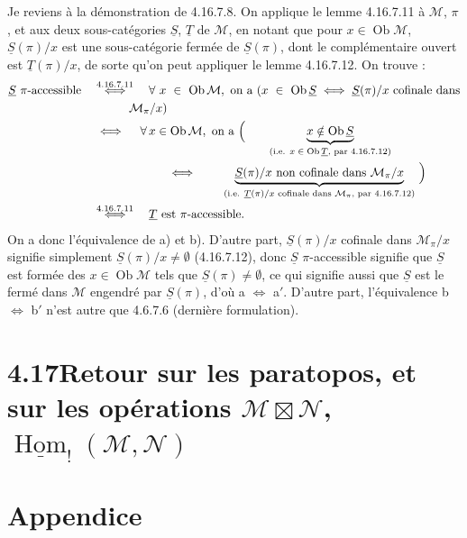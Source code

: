 \documentclass[11pt]{article}
\newcommand{\printedpage}[1]{\marginpar{\footnotesize p.~#1}}
\newcommand{\msp}[1]{\marginpar{\footnotesize [#1]}}
\newcommand{\cM}{\mathcal{M}}
\newcommand{\cN}{\mathcal{N}}
\newcommand{\Ob}{\operatorname{Ob}}
\begin{document}
\noindent Je reviens à la démonstration de 4.16.7.8. On applique le lemme 4.16.7.11 à $\cM$, $\pi$, et aux deux
\msp{page 491}
sous-catégories $\underline{S}$, $\underline{T}$ de $\cM$, en notant que pour $x\in\Ob\cM$, $\underline{S}(\pi)/x$ est une sous-catégorie fermée de $\underline{S}(\pi)$, dont le complémentaire ouvert est $\underline{T}(\pi)/x$, de sorte qu'on peut appliquer le lemme 4.16.7.12. On trouve :
\[
\begin{aligned}
\underline{S}\ \pi\text{-accessible} \quad &\overset{4.16.7.11}{\iff} \quad \forall\ x\ \in\ \Ob\cM,\ \text{on a } (x\ \in\ \Ob\underline{S}\iff\underline{S}(\pi)/x \text{ cofinale dans}\\
&\qquad\quad \cM_\pi/x)\\
&\iff \quad \forall\, x\in\Ob\cM,\ \text{on a } \Bigl( \qquad \underbrace{x\notin\Ob\underline{S}}_{\text{(i.e. $x\in\Ob\underline{T}$, par 4.16.7.12)}}\\
&\qquad\qquad\qquad \iff \qquad \underbrace{\underline{S}(\pi)/x \text{ non cofinale dans } \cM_\pi/x}_{\text{(i.e. $\underline{T}(\pi)/x$ cofinale dans $\cM_\pi$, par 4.16.7.12)}} \ \Bigr)\\
&\overset{4.16.7.11}{\iff} \quad \underline{T} \text{ est } \pi\text{-accessible.}
\end{aligned}
\]
On a donc l'équivalence de a) et b). D'autre part, $\underline{S}(\pi)/x$ cofinale dans $\cM_\pi/x$ signifie simplement $\underline{S}(\pi)/x\neq\emptyset$ (4.16.7.12), donc $\underline{S}$ $\pi$-accessible signifie que $\underline{S}$ est formée des $x\in\Ob\cM$ tels que $\underline{S}(\pi)\neq\emptyset$, ce qui signifie aussi que $\underline{S}$ est le fermé dans $\cM$ engendré par $\underline{S}(\pi)$, d'où a $\iff$ a$'$. D'autre part, l'équivalence b $\iff$ b$'$ n'est autre que 4.6.7.6 (dernière formulation). %

\msp{page 492}

\section*{4.17\quad Retour sur les paratopos, et sur les opérations $\cM\boxtimes\cN$, $\underline{\operatorname{Hom}}_{!}(\cM,\cN)$}

\noindent

\printedpage{191}

\msp{page 1}

\section*{Appendice}
\end{document}
